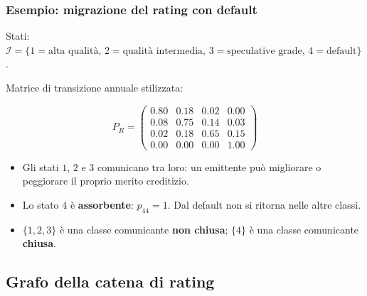 \documentclass[handout]{beamer}%
\newenvironment{stepitemize}{\begin{itemize}[<+->]}{\end{itemize} }
\providecommand{\QTR}[2]{\csname #1\endcsname{#2}}
\begin{document}
\begin{frame}%
%

\frametitle{Esempio: migrazione del rating con default}%
%

%


Stati: $\mathcal{I} = \{ 1=\text{alta qualit\`{a}}, \, 2=\text{qualit\`{a}
intermedia}, \, 3=\text{speculative grade}, \, 4=\text{default} \}$.

\medskip

Matrice di transizione annuale stilizzata:%

\[
P_{R} =
\begin{pmatrix}
0.80 & 0.18 & 0.02 & 0.00\\
0.08 & 0.75 & 0.14 & 0.03\\
0.02 & 0.18 & 0.65 & 0.15\\
0.00 & 0.00 & 0.00 & 1.00
\end{pmatrix}
\]


\medskip

\begin{stepitemize}
\item Gli stati $1$, $2$ e $3$ comunicano tra loro: un emittente pu\`{o}
migliorare o peggiorare il proprio merito creditizio.

\item Lo stato $4$ \`{e} \textbf{assorbente}: $p_{44}=1$. Dal default non si
ritorna nelle altre classi.

\item $\{1,2,3\}$ \`{e} una classe comunicante \textbf{non chiusa}; $\{4\}$
\`{e} una classe comunicante \textbf{chiusa}.
\end{stepitemize}%

\transboxout
\end{frame}%




\subsection{Grafo della catena di rating}%
\end{document}

